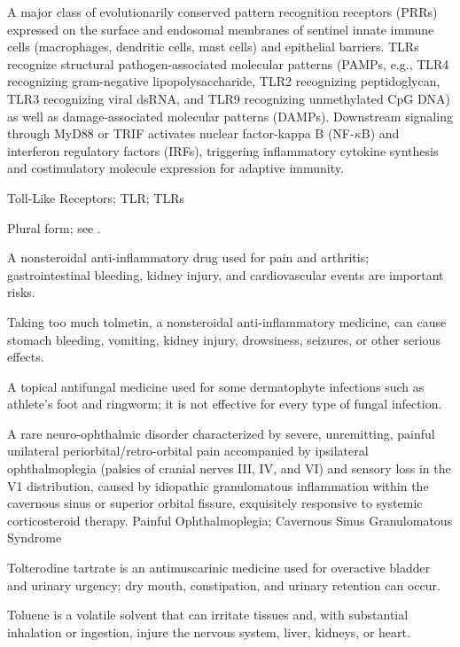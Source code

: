  A major class of evolutionarily conserved pattern recognition receptors (PRRs) expressed on the surface and endosomal membranes of sentinel innate immune cells (macrophages, dendritic cells, mast cells) and epithelial barriers. TLRs recognize structural pathogen-associated molecular patterns (PAMPs, e.g., TLR4 recognizing gram-negative lipopolysaccharide, TLR2 recognizing peptidoglycan, TLR3 recognizing viral dsRNA, and TLR9 recognizing unmethylated CpG DNA) as well as damage-associated molecular patterns (DAMPs). Downstream signaling through MyD88 or TRIF activates nuclear factor-kappa B (NF-$\kappa$B) and interferon regulatory factors (IRFs), triggering inflammatory cytokine synthesis and costimulatory molecule expression for adaptive immunity.

\synonyms
Toll-Like Receptors; TLR; TLRs

 Plural form; see .

 A nonsteroidal anti-inflammatory drug used for pain and arthritis; gastrointestinal bleeding, kidney injury, and cardiovascular events are important risks.

 Taking too much tolmetin, a nonsteroidal anti-inflammatory medicine, can cause stomach bleeding, vomiting, kidney injury, drowsiness, seizures, or other serious effects.

 A topical antifungal medicine used for some dermatophyte infections such as athlete's foot and ringworm; it is not effective for every type of fungal infection.

 A rare neuro-ophthalmic disorder characterized by severe, unremitting, painful unilateral periorbital/retro-orbital pain accompanied by ipsilateral ophthalmoplegia (palsies of cranial nerves III, IV, and VI) and sensory loss in the V1 distribution, caused by idiopathic granulomatous inflammation within the cavernous sinus or superior orbital fissure, exquisitely responsive to systemic corticosteroid therapy.
\synonyms
Painful Ophthalmoplegia; Cavernous Sinus Granulomatous Syndrome

 Tolterodine tartrate is an antimuscarinic medicine used for overactive bladder and urinary urgency; dry mouth, constipation, and urinary retention can occur.

 Toluene is a volatile solvent that can irritate tissues and, with substantial inhalation or ingestion, injure the nervous system, liver, kidneys, or heart.

